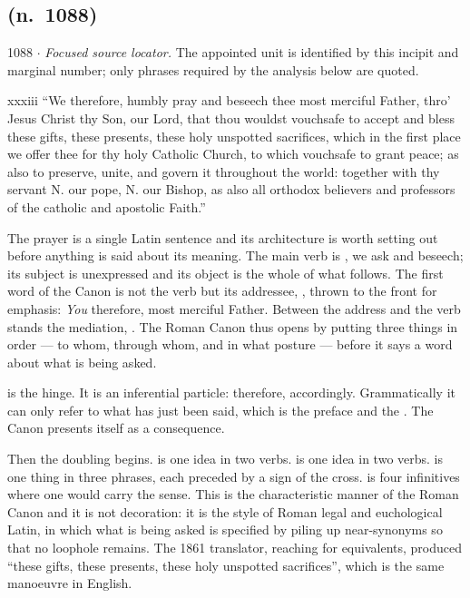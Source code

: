 \subsection*{ (n.~1088)}

\begin{appointed}{1088 $\cdot$ }
\textit{Focused source locator.} The appointed unit is identified by this incipit and marginal number; only phrases required by the analysis below are quoted.
\end{appointed}

\begin{englishwitness}{xxxiii}
``We therefore, humbly pray and beseech thee most merciful Father, thro' Jesus
Christ thy Son, our Lord, that thou wouldst vouchsafe to accept and bless these
gifts, these presents, these holy unspotted sacrifices, which in the first
place we offer thee for thy holy Catholic Church, to which vouchsafe to grant
peace; as also to preserve, unite, and govern it throughout the world: together
with thy servant N. our pope, N. our Bishop, as also all orthodox believers and
professors of the catholic and apostolic Faith.''
\end{englishwitness}

The prayer is a single Latin sentence and its architecture is worth setting out
before anything is said about its meaning. The main verb is
, we ask and beseech; its subject is unexpressed
and its object is the whole of what follows. The first word of the Canon is not
the verb but its addressee, , thrown to the front for emphasis:
\emph{You} therefore, most merciful Father. Between the address and the verb
stands the mediation, . The Roman Canon thus opens by putting three things in order --- to
whom, through whom, and in what posture --- before it says a word about what
is being asked.

 is the hinge. It is an inferential particle: therefore,
accordingly. Grammatically it can only refer to what has just been said, which
is the preface and the . The Canon presents itself as a
consequence.

Then the doubling begins.  is one idea in two
verbs.  is one idea in two verbs.
 is one thing
in three phrases, each preceded by a sign of the cross.  is four infinitives where one would carry the
sense. This is the characteristic manner of the Roman Canon and it is not
decoration: it is the style of Roman legal and euchological Latin, in which
what is being asked is specified by piling up near-synonyms so that no
loophole remains. The 1861 translator, reaching for equivalents, produced
``these gifts, these presents, these holy unspotted sacrifices'', which is the
same manoeuvre in English.

